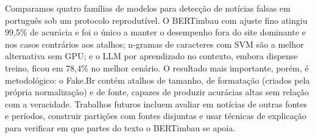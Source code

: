 Comparamos quatro famílias de modelos para detecção de notícias falsas em português sob um protocolo reprodutível. O BERTimbau com ajuste fino atingiu 99,5\% de acurácia e foi o único a manter o desempenho fora do site dominante e nos casos contrários aos atalhos; n-gramas de caracteres com SVM são a melhor alternativa sem GPU; e o LLM por aprendizado no contexto, embora dispense treino, ficou em 78,4\% no melhor cenário. O resultado mais importante, porém, é metodológico: o Fake.Br contém atalhos de tamanho, de formatação (criados pela própria normalização) e de fonte, capazes de produzir acurácias altas sem relação com a veracidade. Trabalhos futuros incluem avaliar em notícias de outras fontes e períodos, construir partições com fontes disjuntas e usar técnicas de explicação para verificar em que partes do texto o BERTimbau se apoia.






